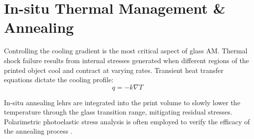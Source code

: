 \section{In-situ Thermal Management \& Annealing}
Controlling the cooling gradient is the most critical aspect of glass AM. Thermal shock failure results from internal stresses generated when different regions of the printed object cool and contract at varying rates. Transient heat transfer equations dictate the cooling profile:
\begin{equation}
q = -k \nabla T
\end{equation}

In-situ annealing lehrs are integrated into the print volume to slowly lower the temperature through the glass transition range, mitigating residual stresses. Polarimetric photoelastic stress analysis is often employed to verify the efficacy of the annealing process \cite{oxman2015glass}.
